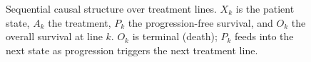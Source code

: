 \begin{figure}[h]
    \caption{Sequential causal structure over treatment lines. $X_k$ is the patient state,
    $A_k$ the treatment, $P_k$ the progression-free survival, and $O_k$ the overall survival
    at line $k$. $O_k$ is terminal (death); $P_k$ feeds into the next state as progression
    triggers the next treatment line.}
    \label{fig:dag}
\end{figure}
